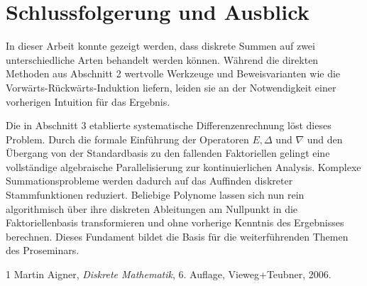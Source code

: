 \documentclass{article}
\theoremstyle{definition}
\begin{document}
\begin{center}
\end{center}
\vspace{0.5em}

\section{Schlussfolgerung und Ausblick}
In dieser Arbeit konnte gezeigt werden, dass diskrete Summen auf zwei unterschiedliche Arten behandelt werden können. Während die direkten Methoden aus Abschnitt 2 wertvolle Werkzeuge und Beweisvarianten wie die Vorwärts-Rückwärts-Induktion liefern, leiden sie an der Notwendigkeit einer vorherigen Intuition für das Ergebnis. 

Die in Abschnitt 3 etablierte systematische Differenzenrechnung löst dieses Problem. Durch die formale Einführung der Operatoren $E, \Delta$ und $\nabla$ und den Übergang von der Standardbasis zu den fallenden Faktoriellen gelingt eine vollständige algebraische Parallelisierung zur kontinuierlichen Analysis. Komplexe Summationsprobleme werden dadurch auf das Auffinden diskreter Stammfunktionen reduziert.
Beliebige Polynome lassen sich nun rein algorithmisch über ihre diskreten Ableitungen am Nullpunkt in die Faktoriellenbasis transformieren und ohne vorherige Kenntnis des Ergebnisses berechnen. Dieses Fundament bildet die Basis für die weiterführenden Themen des Proseminars.

\begin{thebibliography}{1}
Martin Aigner, \textit{Diskrete Mathematik}, 6. Auflage, Vieweg+Teubner, 2006.
\end{thebibliography}
\end{document}
